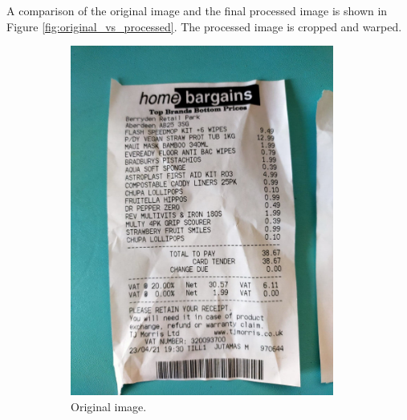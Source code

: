 \documentclass[
  digital, %
  table,   %
  oneside, %
  lof,     %
  lot,     %
]{fithesis3}
\newcommand\half{0.45}
\newcommand\subfigsize{0.95}
\begin{document}
A comparison of the original image and the final processed image is shown in Figure \ref{fig:original_vs_processed}. The processed image is cropped and warped.

\begin{figure}
    \centering
    \begin{subfigure}[t]{\half\textwidth}
      \centering
      \includegraphics[width=\subfigsize\textwidth]{figures/image_processing/original_image}
      \caption{Original image.}
    \end{subfigure}
    \begin{subfigure}[t]{\half\textwidth}
      \centering

\end{subfigure}
\end{figure}
\end{document}
